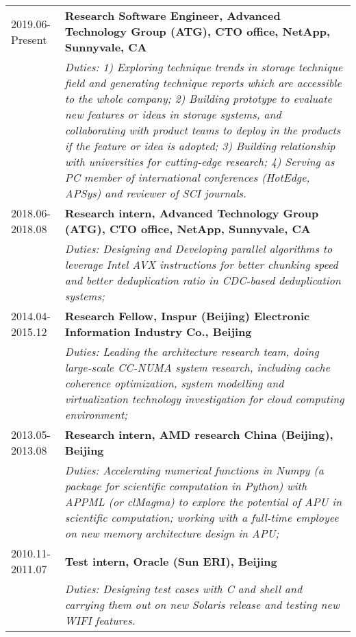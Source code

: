 \documentclass{article}
\begin{document}
    \begin{tabular}{lp{15cm}}
         2019.06-Present & \bf{Research Software Engineer, Advanced Technology Group (ATG), CTO office, NetApp, Sunnyvale, CA} \\
         & \small{\it Duties: 1) Exploring technique trends in storage technique field and generating technique reports which are accessible to the whole company; 
         2) Building prototype to evaluate new features or ideas in storage systems, and collaborating with product teams to deploy in the products if the feature or idea is adopted;
         3) Building relationship with universities for cutting-edge research; 
         4) Serving as PC member of international conferences (HotEdge, APSys) and reviewer of SCI journals. }\\
         2018.06-2018.08 & \bf{Research intern, Advanced Technology Group (ATG), CTO office, NetApp, Sunnyvale, CA}\\
         & \small{\it Duties: Designing and Developing parallel algorithms to leverage Intel AVX instructions for better chunking speed and better deduplication ratio in CDC-based deduplication systems;}\\
         2014.04-2015.12 &\bf{Research Fellow,  Inspur (Beijing) Electronic Information Industry Co., Beijing}\\
         & \small{\it Duties: Leading the architecture research team, doing large-scale CC-NUMA system research, including cache coherence optimization, system modelling and virtualization technology investigation for cloud computing environment;}\\
         2013.05-2013.08 & \bf {Research intern, AMD research China (Beijing), Beijing}\\
         &\small{\it Duties: Accelerating numerical functions in Numpy (a package for scientific computation in Python) with APPML (or clMagma) to explore the potential of APU in scientific computation; working with a full-time employee on new memory architecture design in APU;}\\
         2010.11-2011.07 & \bf{Test intern, Oracle (Sun ERI), Beijing} \\
         &\small{\it Duties: Designing test cases with C and shell and carrying them out on new Solaris release and testing new WIFI features.}
    \end{tabular}
\end{document}
